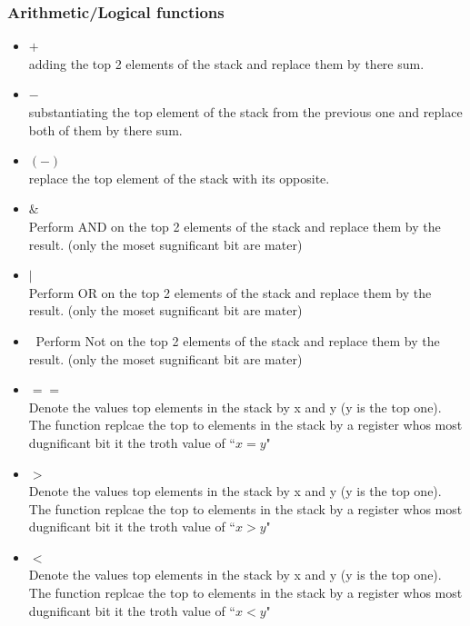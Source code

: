 \documentclass[12pt]{amsart}
\begin{document}
\subsubsection{Arithmetic/Logical functions}
\begin{itemize}	
	\item		$+$\\
			adding the top 2 elements of the stack and replace them by there sum.
	\item	$-$\\
			substantiating the top  element of the stack from the previous one and replace both of them by there sum.
			
	\item	$(-)$\\			
			replace the top  element of the stack with its opposite.
			
	\item	$\&$\\
			Perform AND on the top 2 elements of the stack and replace them by the result. (only the moset sugnificant bit are mater)
			
	\item	$|$\\
			Perform OR on the top 2 elements of the stack and replace them by the result. (only the moset sugnificant bit are mater)

	\item	$~$
			Perform Not on the top 2 elements of the stack and replace them by the result. (only the moset sugnificant bit are mater)

	\item	$==$\\
			Denote the values top elements in the stack by x and y (y is the top one). The function replcae the top to elements in the stack by a register whos most dugnificant bit it the troth value of 
	``$x=y$"
			
\item	$>$\\
			Denote the values top elements in the stack by x and y (y is the top one). The function replcae the top to elements in the stack by a register whos most dugnificant bit it the troth value of 
			``$x>y$"
			
\item				$<$\\
			Denote the values top elements in the stack by x and y (y is the top one). The function replcae the top to elements in the stack by a register whos most dugnificant bit it the troth value of 
			``$x<y$"
\end{itemize}	
			
\end{document}
